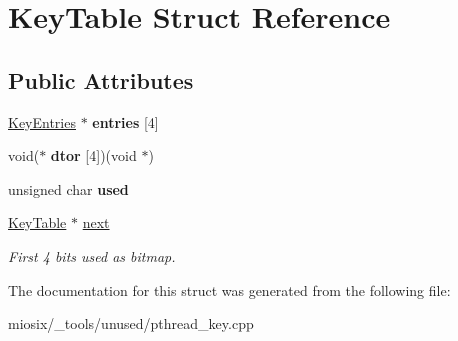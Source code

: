 \hypertarget{struct_key_table}{\section{Key\-Table Struct Reference}
\label{struct_key_table}
}
\subsection*{Public Attributes}
\begin{DoxyCompactItemize}
\item 
\hypertarget{struct_key_table_ab86def654aa21b49085e6e9e341745e9}{\hyperlink{struct_key_entries}{Key\-Entries} $\ast$ {\bfseries entries} \mbox{[}4\mbox{]}}\label{struct_key_table_ab86def654aa21b49085e6e9e341745e9}

\item 
\hypertarget{struct_key_table_a43e0868da5cf2475ce061f56ed805048}{void($\ast$ {\bfseries dtor} \mbox{[}4\mbox{]})(void $\ast$)}\label{struct_key_table_a43e0868da5cf2475ce061f56ed805048}

\item 
\hypertarget{struct_key_table_a80dfbefd509691f1a90b6959c3407c9c}{unsigned char {\bfseries used}}\label{struct_key_table_a80dfbefd509691f1a90b6959c3407c9c}

\item 
\hypertarget{struct_key_table_a9683008a7c120f06f7d010da0261f320}{\hyperlink{struct_key_table}{Key\-Table} $\ast$ \hyperlink{struct_key_table_a9683008a7c120f06f7d010da0261f320}{next}}\label{struct_key_table_a9683008a7c120f06f7d010da0261f320}

\begin{DoxyCompactList}\small\item\em First 4 bits used as bitmap. \end{DoxyCompactList}\end{DoxyCompactItemize}


The documentation for this struct was generated from the following file\-:\begin{DoxyCompactItemize}
\item 
miosix/\-\_\-tools/unused/pthread\-\_\-key.\-cpp\end{DoxyCompactItemize}
